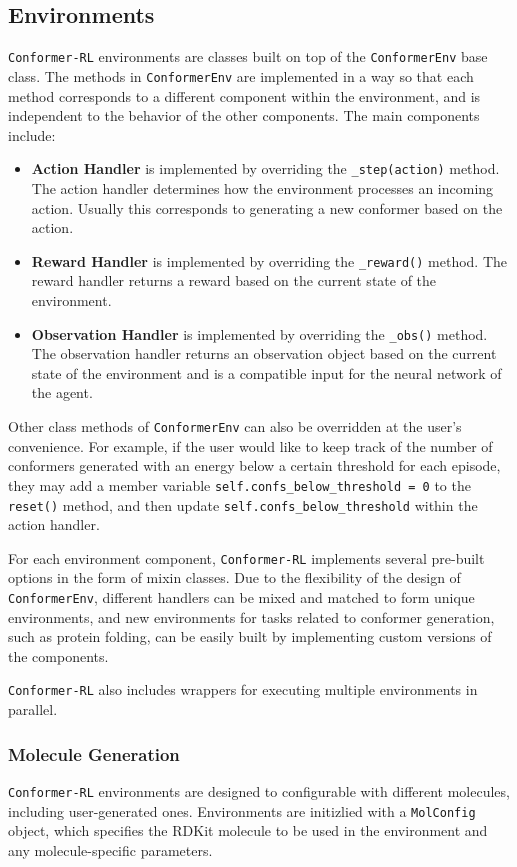 \documentclass[twoside,11pt]{article}
\newcommand{\code}[1]{\texttt{#1}}
\newcommand{\titleofpaper}{Conformer-RL}
\begin{document}
\subsection{Environments}
\code{\titleofpaper} environments are classes built on top of the \code{ConformerEnv} base class. The methods in \code{ConformerEnv} are implemented in a way so that each method corresponds to a different component within the environment, and is independent to the behavior of the other components. The main components include:
\begin{itemize}
  \item \textbf{Action Handler} is implemented by overriding the \code{\_step(action)} method. The action handler determines how the environment processes an incoming action. Usually this corresponds to generating a new conformer based on the action.
  \item \textbf{Reward Handler} is implemented by overriding the \code{\_reward()} method. The reward handler returns a reward based on the current state of the environment.
  \item \textbf{Observation Handler} is implemented by overriding the \code{\_obs()} method. The observation handler returns an observation object based on the current state of the environment and is a compatible input for the neural network of the agent.
\end{itemize}
Other class methods of \code{ConformerEnv} can also be overridden at the user's convenience. For example, if the user would like to keep track of the number of conformers generated with an energy below a certain threshold for each episode, they may add a member variable \code{self.confs\_below\_threshold = 0} to the \code{reset()} method, and then update \code{self.confs\_below\_threshold} within the action handler.

For each environment component, \code{\titleofpaper} implements several pre-built options in the form of mixin classes. Due to the flexibility of the design of \code{ConformerEnv}, different handlers can be mixed and matched to form unique environments, and new environments for tasks related to conformer generation, such as protein folding, can be easily built by implementing custom versions of the components.

\code{\titleofpaper} also includes wrappers for executing multiple environments in parallel. 

  \subsubsection{Molecule Generation}
  \code{\titleofpaper} environments are designed to configurable with different molecules, including user-generated ones. Environments are initizlied with a \code{MolConfig} object, which specifies the RDKit molecule to be used in the environment and any molecule-specific parameters.
\end{document}
